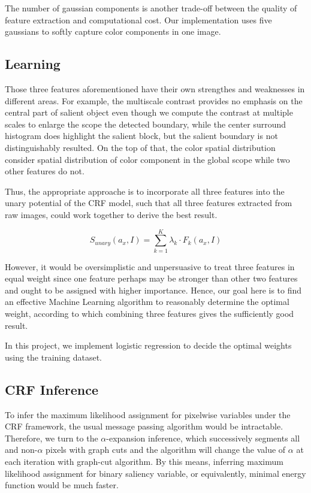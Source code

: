 \documentclass[10pt,twocolumn,letterpaper]{article}
\newcommand{\SUM}{\sum\limits}
\begin{document}
The number of gaussian components is another trade-off between the quality of 
feature extraction and computational cost. Our implementation uses five gaussians 
to softly capture color components in one image. 


\subsection{Learning}
Those three features aforementioned have their own strengthes and weaknesses in different areas. 
For example, the multiscale contrast provides no emphasis on the central part of salient object even though 
we compute the contrast at multiple scales to enlarge the scope the detected boundary, while 
the center surround histogram does highlight the salient block, but the salient boundary is not distinguishably 
resulted. On the top of that, the color spatial distribution consider spatial distribution of color component in the
global scope while two other features do not.

Thus, the appropriate approache is to incorporate all three features into the unary potential
of the CRF model, such that all three features extracted from raw images, could work together
to derive the best result. 

$$
   S_{unary}(a_x,I) = \SUM_{k=1}^K \lambda_k \cdot F_k(a_x,I) 
$$

However, it would be oversimplistic and unpersuasive to treat three
features in equal weight since one feature perhaps may be stronger than other two features and
ought to be assigned with higher importance. Hence, our goal here is to find an effective 
Machine Learning algorithm to reasonably determine the optimal weight, according to which combining three
features gives the sufficiently good result. 

In this project, we implement logistic regression to decide the optimal weights using the training dataset.


\subsection{CRF Inference}
To infer the maximum likelihood assignment for pixelwise variables under the CRF framework,
the usual message passing algorithm would be intractable. Therefore, we turn to the $\alpha$-expansion inference,
which successively segments all and non-$\alpha$ pixels with graph cuts and the algorithm will
change the value of $\alpha$ at each iteration with graph-cut algorithm. By this means,
inferring maximum likelihood assignment for binary saliency variable, or equivalently,
minimal energy function would be much faster. 
\end{document}
